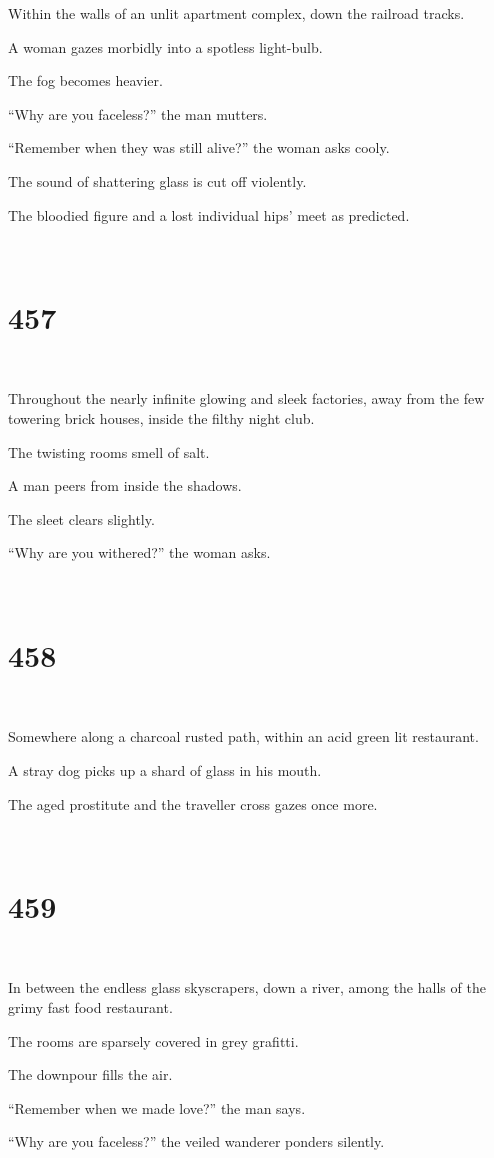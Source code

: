 \documentclass{report}
\begin{document}
Within the walls of an unlit apartment complex, down the railroad tracks.

A woman gazes morbidly into a spotless light-bulb.

The fog becomes heavier.

``Why are you faceless?'' the man mutters.

``Remember when they was still alive?'' the woman asks cooly.

The sound of shattering glass is cut off violently.

The bloodied figure and a lost individual hips' meet as predicted.

~
\chapter*{457}
~

Throughout the nearly infinite glowing and sleek factories, away from the few towering brick houses, inside the filthy night club.

The twisting rooms smell of salt.

A man peers from inside the shadows.

The sleet clears slightly.

``Why are you withered?'' the woman asks.

~
\chapter*{458}
~

Somewhere along a charcoal rusted path, within an acid green lit restaurant.

A stray dog picks up a shard of glass in his mouth.

The aged prostitute and the traveller cross gazes once more.

~
\chapter*{459}
~

In between the endless glass skyscrapers, down a river, among the halls of the grimy fast food restaurant.

The rooms are sparsely covered in grey grafitti.

The downpour fills the air.

``Remember when we made love?'' the man says.

``Why are you faceless?'' the veiled wanderer ponders silently.
\end{document}
